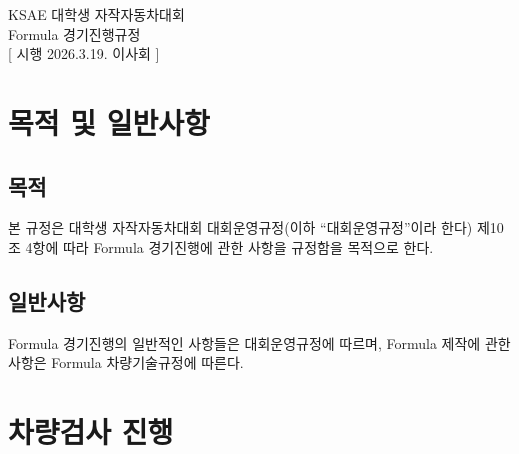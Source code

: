 \documentclass[final,a4paper,10pt]{report}
\begin{document}
\thispagestyle{firstpage}

\begin{center}
  {\pretendardb\fontsize{24}{28}\selectfont{} KSAE 대학생 자작자동차대회}\\[2ex]
  {\pretendardb\fontsize{24}{28}\selectfont{} Formula 경기진행규정}\\[2.5ex]
  [ 시행 2026.3.19. 이사회 ]
\end{center}

\chapter{목적 및 일반사항}

\section{목적}\label{rule:formula-competition.purpose}
본 규정은 대학생 자작자동차대회 대회운영규정(이하 ``대회운영규정''이라 한다) 제10조 4항에 따라 Formula 경기진행에 관한 사항을 규정함을 목적으로 한다.

\section{일반사항}\label{rule:formula-competition.general-provisions}
Formula 경기진행의 일반적인 사항들은 대회운영규정에 따르며, Formula 제작에 관한 사항은 Formula 차량기술규정에 따른다.

\chapter{차량검사 진행}
\end{document}
